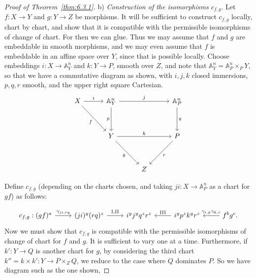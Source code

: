 \begin{proof}[Proof of Theorem~\ref{thm:6.3.1}]
\medskip{}\label{construction:6.3.b}\noindent b) \textit{Construction of the isomorphisms $c_{f,g}$}. Let $f\colon X\to Y$ and $g\colon Y\to Z$ be morphisms. It will be sufficient to construct $c_{f,g}$ locally, chart by chart, and show that it is compatible with the permissible isomorphisms of change of chart. For then we can glue. Thus we may assume that $f$ and $g$ are embeddable in smooth morphisms, and we may even assume that $f$ is embeddable in an affine space over $Y$, since that is possible locally. Choose embeddings
$i: X \longrightarrow \mathbb{A}^n_Y$ and $k: Y \longrightarrow P$, smooth
over $Z$, and note that $\mathbb{A}^n_Y = \mathbb{A}^n_P \times_P Y$, so
that we have a commutative diagram as
shown, with $i, j, k$ closed immersions, $p, q, r$ smooth, and the upper right square Cartesian.
\[
\begin{tikzcd}[row sep=1.2cm, column sep=1cm]
	X \arrow[r, "i"] \arrow[dr, "f"'] & \mathbb{A}^n_Y \arrow[rr, "j"] \arrow[d, "p"'] & & \mathbb{A}^n_P \arrow[d, "q"] \\
	& Y \arrow[rr, "k"] \arrow[dr, "g"'] & & P \arrow[dl, "r"] \\
	& & Z &
\end{tikzcd}
\]

Define $c_{f,g}$ (depending on the charts chosen, and taking $ji: X \longrightarrow \mathbb{A}^n_P$ as a chart for $gf$) as follows:

\[
\begin{tikzcd}
	c_{f,g}: (gf)^a \arrow[r, "\gamma_{ji,rq}"] & (ji)^y(rq)^z \arrow[r,"\mathrm{I,II}"] & i^y j^y q^z r^z & i^y p^z k^y r^z \arrow[l, "\mathrm{III}"'] & f^b g^c. \arrow[l, "\gamma_{i,p} \gamma_{k,r}"']
\end{tikzcd}
\]
Now we must show that $c_{f,g}$ is compatible with the permissible isomorphisms of change of chart for $f$ and $g$. It is sufficient to vary one at a time. Furthermore, if $k'\colon Y\to Q$ is another chart for $g$, by considering the third chart $k'' = k\times k'\colon Y\to P\times_Z Q$, we reduce to the case where $Q$ dominates $P$. So we have diagram such as the one shown,


\end{proof}
